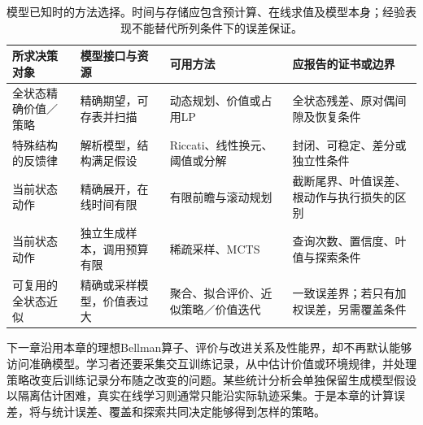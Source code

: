 \begin{table}[htbp]
 \centering
 \small
 \begin{tabularx}{\linewidth}{@{}l>{\raggedright\arraybackslash}X>{\raggedright\arraybackslash}X>{\raggedright\arraybackslash}X@{}}
  \toprule
  所求决策对象 & 模型接口与资源 & 可用方法 & 应报告的证书或边界\\
  \midrule
  全状态精确价值／策略 & 精确期望，可存表并扫描 & 动态规划、价值或占用LP & 全状态残差、原对偶间隙及恢复条件\\
  特殊结构的反馈律 & 解析模型，结构满足假设 & Riccati、线性换元、阈值或分解 & 封闭、可稳定、差分或独立性条件\\
  当前状态动作 & 精确展开，在线时间有限 & 有限前瞻与滚动规划 & 截断尾界、叶值误差、根动作与执行损失的区别\\
  当前状态动作 & 独立生成样本，调用预算有限 & 稀疏采样、MCTS & 查询次数、置信度、叶值与探索条件\\
  可复用的全状态近似 & 精确或采样模型，价值表过大 & 聚合、拟合评价、近似策略／价值迭代 & 一致误差界；若只有加权误差，另需覆盖条件\\
  \bottomrule
 \end{tabularx}
 \caption{模型已知时的方法选择。时间与存储应包含预计算、在线求值及模型本身；经验表现不能替代所列条件下的误差保证。}
 \label{tab:rl-planning-method-choice}
\end{table}

下一章沿用本章的理想Bellman算子、评价与改进关系及性能界，却不再默认能够访问准确模型。学习者还要采集交互训练记录，从中估计价值或环境规律，并处理策略改变后训练记录分布随之改变的问题。某些统计分析会单独保留生成模型假设以隔离估计困难，真实在线学习则通常只能沿实际轨迹采集。于是本章的计算误差，将与统计误差、覆盖和探索共同决定能够得到怎样的策略。
